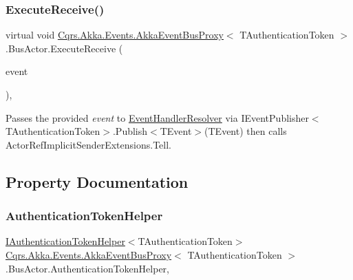 \subsubsection{\texorpdfstring{Execute\+Receive()}{ExecuteReceive()}}
{\footnotesize\ttfamily virtual void \hyperlink{classCqrs_1_1Akka_1_1Events_1_1AkkaEventBusProxy}{Cqrs.\+Akka.\+Events.\+Akka\+Event\+Bus\+Proxy}$<$ T\+Authentication\+Token $>$.Bus\+Actor.\+Execute\+Receive (\begin{DoxyParamCaption}\item[{\hyperlink{interfaceCqrs_1_1Events_1_1IEvent}{I\+Event}$<$ T\+Authentication\+Token $>$ @}]{event }\end{DoxyParamCaption})\hspace{0.3cm}{\ttfamily [protected]}, {\ttfamily [virtual]}}



Passes the provided {\itshape event}  to \hyperlink{classCqrs_1_1Akka_1_1Events_1_1AkkaEventBusProxy_1_1BusActor_ae7986841b1bb97368936c52655b72f96_ae7986841b1bb97368936c52655b72f96}{Event\+Handler\+Resolver} via I\+Event\+Publisher$<$\+T\+Authentication\+Token$>$.\+Publish$<$\+T\+Event$>$(\+T\+Event) then calls Actor\+Ref\+Implicit\+Sender\+Extensions.\+Tell. 



\subsection{Property Documentation}
\mbox{\label{classCqrs_1_1Akka_1_1Events_1_1AkkaEventBusProxy_1_1BusActor_a5a276908d994a77c84e12e73ff73a286_a5a276908d994a77c84e12e73ff73a286}} 
\subsubsection{\texorpdfstring{Authentication\+Token\+Helper}{AuthenticationTokenHelper}}
{\footnotesize\ttfamily \hyperlink{interfaceCqrs_1_1Authentication_1_1IAuthenticationTokenHelper}{I\+Authentication\+Token\+Helper}$<$T\+Authentication\+Token$>$ \hyperlink{classCqrs_1_1Akka_1_1Events_1_1AkkaEventBusProxy}{Cqrs.\+Akka.\+Events.\+Akka\+Event\+Bus\+Proxy}$<$ T\+Authentication\+Token $>$.Bus\+Actor.\+Authentication\+Token\+Helper\hspace{0.3cm}{\ttfamily [get]}, {\ttfamily [protected]}}



